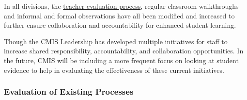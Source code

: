 \begin{findings}
In all divisions, the \href{https://docs.google.com/document/d/15_5X5QtixmWVheEUBVO9N1aislsLDm_ZW4-4g4YQ7F4/edit?ts=589d25d9}{teacher evaluation process}, regular classroom walkthroughs and informal and formal observations have all been modified and increased to further ensure collaboration and accountability for enhanced student learning.


Though the CMIS Leadership has developed multiple  initiatives for staff to increase shared responsibility, accountability, and collaboration opportunities.  In the future, CMIS will be including a more frequent focus on looking at student evidence to help in evaluating the effectiveness of these current initiatives. 
\end{findings}

\subsubsection{Evaluation of Existing Processes}



